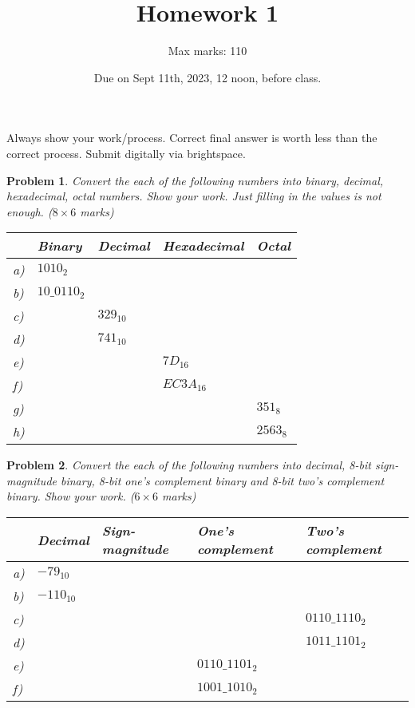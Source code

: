 \documentclass{article}
\title{Homework 1}
\author{Max marks: 110}
\date{Due on Sept 11th, 2023, 12 noon, before class. }
\newtheorem{prob}{Problem}
\begin{document}
\maketitle
Always show your work/process. Correct final answer is worth less than the
correct process. Submit digitally via brightspace.

\begin{prob}
  Convert the each of the following numbers into binary, decimal, hexadecimal,
octal numbers. Show your work. Just filling in the values is not enough. ($8 \times 6 $ marks)

  \begin{tabular}{lllll}
    \toprule
     & Binary & Decimal & Hexadecimal & Octal \\
    \midrule
    a)& $1010_2$     &   &   &    \\
    b)& $10\_0110_2$ &   &   &   \\
    c)&   & $329_{10}$   &   &   \\
    d)&   & $741_{10}$   &   &   \\
    e)&   &   & $7D_{16}$    &   \\
    f)&   &   & $EC3A_{16}$  &   \\
    g)&   &   &   & $351_8$\\
    h)&   &   &   & $2563_8$\\
    \bottomrule
  \end{tabular}
\end{prob}

\vspace{20em}

\begin{prob}
  Convert the each of the following numbers into decimal, 8-bit sign-magnitude binary,
  8-bit one's complement binary and 8-bit two's complement binary. Show your work. ($6 \times 6 $ marks)

  \begin{tabular}{lllll}
    \toprule
    & Decimal & Sign-magnitude & One's complement & Two's complement \\
    \midrule
    a) & $-79_{10}$ & & & \\
    b) & {\color{red}$-110_{10}$} & & & \\
    c) & & & & $0110\_1110_2$ \\
    d) & &  & & $1011\_1101_2$\\
    e) & & & $0110\_1101_2$&  \\
    f) & &  & $1001\_1010_2$& \\
    \bottomrule
  \end{tabular}
\end{prob}
\end{document}
